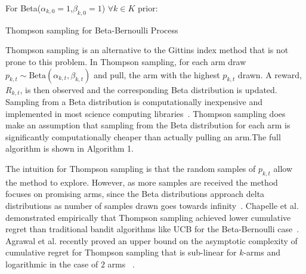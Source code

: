 \documentclass[10pt, conference]{ieeeconf}      %
\begin{document}
\begin{algorithm}
 For Beta($\alpha_{k,0}=1$,$\beta_{k,0}=1$) $\forall k \in K$ prior: \\
 \caption{Thompson sampling for Beta-Bernoulli Process}
\end{algorithm}

Thompson sampling is an alternative to the Gittins index method that is not prone to this problem. 
In Thompson sampling, for each arm draw $p_{k,t} \sim \mbox{Beta}(\alpha_{k,t},\beta_{k,t})$ and pull, the arm with the highest $p_{k,t}$ drawn.
A reward, $R_{k,t}$, is then observed and the corresponding Beta distribution is updated. Sampling from a Beta distribution is computationally inexpensive and implemented  in most science computing libraries~\cite{MATLAB:2010}. Thompson sampling does make an assumption that sampling from the Beta distribution for each arm is significantly computationally cheaper than actually pulling an arm.The full algorithm is shown in Algorithm 1.

The intuition for Thompson sampling is that the random samples of $p_{k,t}$ allow the method to explore. However, as more samples are received the method focuses on promising arms, since the Beta distributions approach delta distributions as number of samples drawn goes towards infinity~\cite{agrawal2011analysis}. Chapelle et al. demonstrated empirically that Thompson sampling achieved lower cumulative regret than traditional bandit algorithms like UCB for the Beta-Bernoulli case~\cite{chapelle2011empirical}. Agrawal et al. recently proved an upper bound on the asymptotic complexity of  cumulative regret for  Thompson sampling that is sub-linear for $k$-arms and logarithmic in the case of $2$ arms ~\cite{agrawal2011analysis}. 
\end{document}
